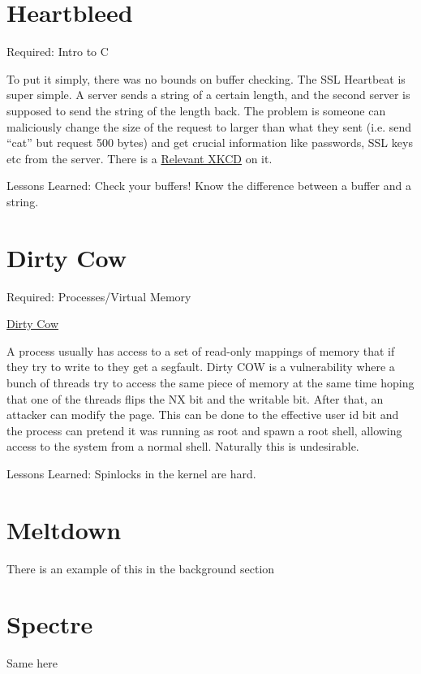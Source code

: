 \section{Heartbleed}

Required: Intro to C

To put it simply, there was no bounds on buffer checking. The SSL Heartbeat is super simple. A server sends a string of a certain length, and the second server is supposed to send the string of the length back. The problem is someone can maliciously change the size of the request to larger than what they sent (i.e. send ``cat'' but request 500 bytes) and get crucial information like passwords, SSL keys etc from the server. There is a \href{https://xkcd.com/1354/}{Relevant XKCD} on it.

Lessons Learned: Check your buffers! Know the difference between a buffer and a string.

\section{Dirty Cow}

Required: Processes/Virtual Memory

\href{https://en.wikipedia.org/wiki/Dirty_COW}{Dirty Cow}

A process usually has access to a set of read-only mappings of memory that if they try to write to they get a segfault. Dirty COW is a vulnerability where a bunch of threads try to access the same piece of memory at the same time hoping that one of the threads flips the NX bit and the writable bit. After that, an attacker can modify the page. This can be done to the effective user id bit and the process can pretend it was running as root and spawn a root shell, allowing access to the system from a normal shell. Naturally this is undesirable.

Lessons Learned: Spinlocks in the kernel are hard.

\section{Meltdown}

There is an example of this in the background section

\section{Spectre}

Same here


